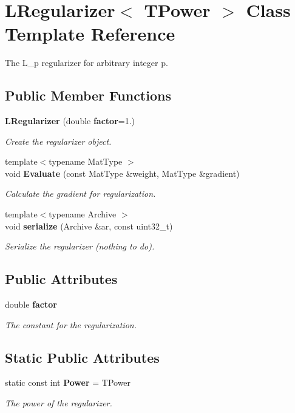\section{L\+Regularizer$<$ T\+Power $>$ Class Template Reference}
\label{classmlpack_1_1ann_1_1LRegularizer}


The L\+\_\+p regularizer for arbitrary integer p.  


\subsection*{Public Member Functions}
\begin{DoxyCompactItemize}
\item 
\textbf{ L\+Regularizer} (double \textbf{ factor}=1.)
\begin{DoxyCompactList}\small\item\em Create the regularizer object. \end{DoxyCompactList}\item 
{\footnotesize template$<$typename Mat\+Type $>$ }\\void \textbf{ Evaluate} (const Mat\+Type \&weight, Mat\+Type \&gradient)
\begin{DoxyCompactList}\small\item\em Calculate the gradient for regularization. \end{DoxyCompactList}\item 
{\footnotesize template$<$typename Archive $>$ }\\void \textbf{ serialize} (Archive \&ar, const uint32\+\_\+t)
\begin{DoxyCompactList}\small\item\em Serialize the regularizer (nothing to do). \end{DoxyCompactList}\end{DoxyCompactItemize}
\subsection*{Public Attributes}
\begin{DoxyCompactItemize}
\item 
double \textbf{ factor}
\begin{DoxyCompactList}\small\item\em The constant for the regularization. \end{DoxyCompactList}\end{DoxyCompactItemize}
\subsection*{Static Public Attributes}
\begin{DoxyCompactItemize}
\item 
static const int \textbf{ Power} = T\+Power
\begin{DoxyCompactList}\small\item\em The power of the regularizer. \end{DoxyCompactList}\end{DoxyCompactItemize}


